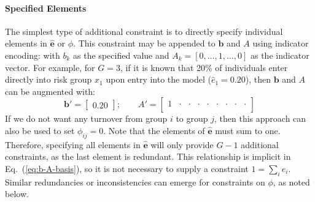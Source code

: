 \paragraph{Specified Elements}
The simplest type of additional constraint is to
directly specify individual elements in $\bm{\hat{e}}$ or $\phi$.
This constraint may be appended to $\bm{b}$ and $A$ using indicator encoding:
with $b_k$ as the specified value and $A_k = [0,\dots,1,\dots,0]$ as the indicator vector.
For example, for $G = 3$, if it is known that 20\% of individuals
enter directly into risk group $x_1$ upon entry into the model ($\hat{e}_1 = 0.20$),
then $\bm{b}$ and $A$ can be augmented with:
\begin{equation}
\bm{b}' = \left[\begin{array}{c} 0.20 \end{array}\right];\qquad
A' = \left[\begin{array}{ccccccccc}
1 & \cdot & \cdot & \cdot & \cdot & \cdot & \cdot & \cdot & \cdot \\
\end{array}\right] 
\end{equation}
If we do not want any turnover from group $i$ to group $j$,
then this approach can also be used to set $\phi_{ij} = 0$.
Note that the elements of $\bm{\hat{e}}$ must sum to one.
Therefore, specifying all elements in $\bm{\hat{e}}$
will only provide $G-1$ additional constraints,
as the last element is redundant.
This relationship is implicit in Eq.~(\ref{eq:b-A-basis}),
so it is not necessary to supply a constraint $1 = \sum_{i} \hat{e}_i$.
Similar redundancies or inconsistencies can emerge for constraints on $\phi$, as noted below.

